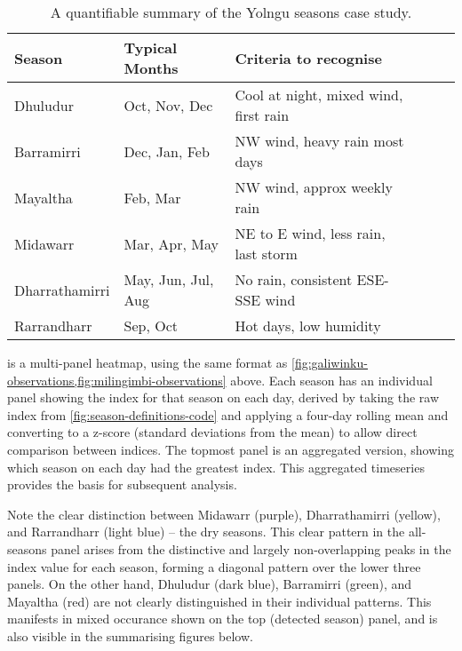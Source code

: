 \begin{table}[h]
    \centering
    \caption{A quantifiable summary of the Yolngu seasons case study.}
    \label{tab:quant-seasons-summary}
    \sffamily\small
    \begin{tabular}{llllll}
        \toprule
        Season          &  Typical Months       &  Criteria to recognise                    \\
        \midrule
        Dhuludur        &  Oct, Nov, Dec        &  Cool at night, mixed wind, first rain    \\
        Barramirri      &  Dec, Jan, Feb        &  NW wind, heavy rain most days            \\
        Mayaltha        &  Feb, Mar             &  NW wind, approx weekly rain              \\
        Midawarr        &  Mar, Apr, May        &  NE to E wind, less rain, last storm      \\
        Dharrathamirri  &  May, Jun, Jul, Aug   &  No rain, consistent ESE-SSE wind         \\
        Rarrandharr     &  Sep, Oct             &  Hot days, low humidity                   \\
        \bottomrule
    \end{tabular}
\end{table}

 is a multi-panel heatmap, using the same format
as \cref{fig:galiwinku-observations,fig:milingimbi-observations} above.
Each season has an individual panel showing the index for that season on each
day, derived by taking the raw index from \cref{fig:season-definitions-code}
and applying a four-day rolling mean and converting to a z-score (standard
deviations from the mean) to allow direct comparison between indices.
%
The topmost panel is an aggregated version, showing which season on each day
had the greatest index.  This aggregated timeseries provides the basis for
subsequent analysis.

Note the clear distinction between Midawarr (purple), Dharrathamirri (yellow),
and Rarrandharr (light blue) -- the dry seasons.  This clear pattern in the
all-seasons panel arises from the distinctive and largely non-overlapping
peaks in the index value for each season, forming a diagonal pattern over
the lower three panels.
%
On the other hand, Dhuludur (dark blue), Barramirri (green), and Mayaltha
(red) are not clearly distinguished in their individual patterns.  This
manifests in mixed occurance shown on the top (detected season) panel, and
is also visible in the summarising figures below.


